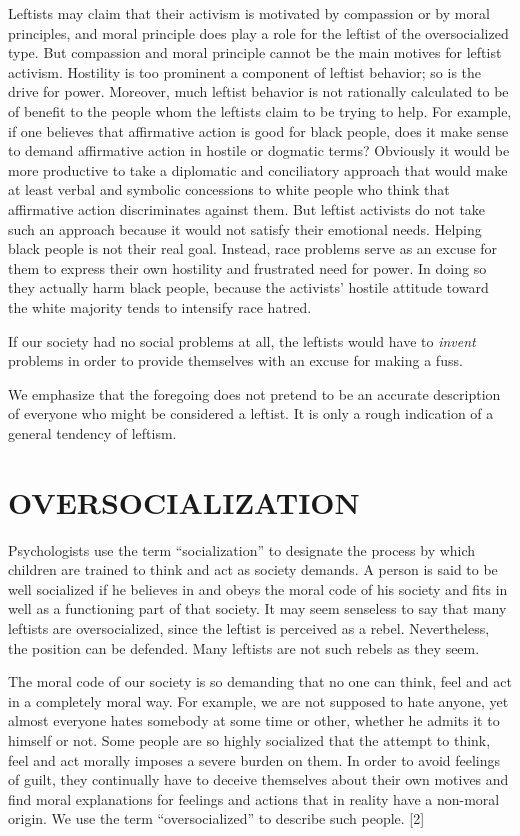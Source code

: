  Leftists may claim that their activism is motivated by compassion or by moral principles, and moral principle does play a role for the leftist of the oversocialized type. But compassion and moral principle cannot be the main motives for leftist activism. Hostility is too prominent a component of leftist behavior; so is the drive for power. Moreover, much leftist behavior is not rationally calculated to be of benefit to the people whom the leftists claim to be trying to help. For example, if one believes that affirmative action is good for black people, does it make sense to demand affirmative action in hostile or dogmatic terms? Obviously it would be more productive to take a diplomatic and conciliatory approach that would make at least verbal and symbolic concessions to white people who think that affirmative action discriminates against them. But leftist activists do not take such an approach because it would not satisfy their emotional needs. Helping black people is not their real goal. Instead, race problems serve as an excuse for them to express their own hostility and frustrated need for power. In doing so they actually harm black people, because the activists’ hostile attitude toward the white majority tends to intensify race hatred.

 If our society had no social problems at all, the leftists would have to {\em invent} problems in order to provide themselves with an excuse for making a fuss.

 We emphasize that the foregoing does not pretend to be an accurate description of everyone who might be considered a leftist. It is only a rough indication of a general tendency of leftism.

\chapter{OVERSOCIALIZATION}

 Psychologists use the term “socialization” to designate the process by which children are trained to think and act as society demands. A person is said to be well socialized if he believes in and obeys the moral code of his society and fits in well as a functioning part of that society. It may seem senseless to say that many leftists are oversocialized, since the leftist is perceived as a rebel. Nevertheless, the position can be defended. Many leftists are not such rebels as they seem.

 The moral code of our society is so demanding that no one can think, feel and act in a completely moral way. For example, we are not supposed to hate anyone, yet almost everyone hates somebody at some time or other, whether he admits it to himself or not. Some people are so highly socialized that the attempt to think, feel and act morally imposes a severe burden on them. In order to avoid feelings of guilt, they continually have to deceive themselves about their own motives and find moral explanations for feelings and actions that in reality have a non-moral origin. We use the term “oversocialized” to describe such people. [2]


